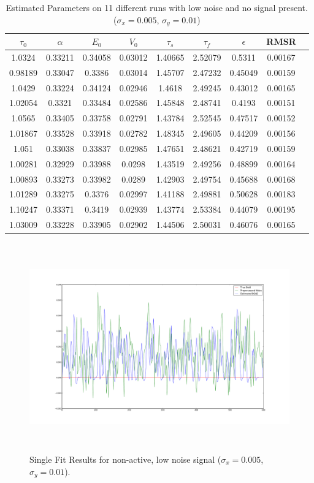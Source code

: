 \begin{table}[t]
\centering
\begin{tabular}{|c | c | c | c | c | c | c | c | c |}
\hline
$\tau_0$ & $\alpha$ & $E_0$    & $V_0$    & $\tau_s$ & $\tau_f$ & $\epsilon$  & \acs{RMSR} \\
\hline
1.0324 & 0.33211 & 0.34058 & 0.03012 & 1.40665 & 2.52079 & 0.5311 &   0.00167  \\
 0.98189 & 0.33047 & 0.3386 & 0.03014 & 1.45707 & 2.47232 & 0.45049 & 0.00159   \\
 1.0429 & 0.33224 & 0.34124 & 0.02946 & 1.4618 & 2.49245 & 0.43012 &  0.00165   \\
 1.02054 & 0.3321 & 0.33484 & 0.02586 & 1.45848 & 2.48741 & 0.4193 &  0.00151   \\
 1.0565 & 0.33405 & 0.33758 & 0.02791 & 1.43784 & 2.52545 & 0.47517 & 0.00152   \\
 1.01867 & 0.33528 & 0.33918 & 0.02782 & 1.48345 & 2.49605 & 0.44209 &0.00156   \\
 1.051 & 0.33038 & 0.33837 & 0.02985 & 1.47651 & 2.48621 & 0.42719 &  0.00159   \\
 1.00281 & 0.32929 & 0.33988 & 0.0298 & 1.43519 & 2.49256 & 0.48899 & 0.00164   \\
 1.00893 & 0.33273 & 0.33982 & 0.0289 & 1.42903 & 2.49754 & 0.45688 & 0.00168   \\
 1.01289 & 0.33275 & 0.3376 & 0.02997 & 1.41188 & 2.49881 & 0.50628 & 0.00183   \\
 1.10247 & 0.33371 & 0.3419 & 0.02939 & 1.43774 & 2.53384 & 0.44079 & 0.00195   \\
\hline
1.03009 & 0.33228 & 0.33905 & 0.02902 & 1.44506 & 2.50031 & 0.46076 & 0.00165 \\
\hline
\end{tabular}
\caption{Estimated Parameters on 11 different runs with low noise and no signal present.
 ($\sigma_x = 0.005$, $\sigma_y = 0.01$)}
\label{tab:NoiseOnlyResults}
\end{table}

\begin{figure}[H]
\centering
\includegraphics[clip=true,trim=6cm 3cm 6cm 3cm,height=9cm]{images/justnoise_fit_0}
\caption {Single Fit Results for non-active, low noise signal ($\sigma_x = 0.005$, $\sigma_y = 0.01$).}
\label{fig:justnoise_fit_0}
\end{figure} %

